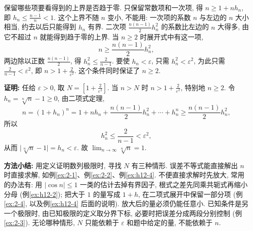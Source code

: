 \documentclass[UTF8,openany]{ctexbook}
\theoremstyle{chinesetextbook}
\newenvironment{cnproof}{\par\indent\textbf{证明:} \ignorespaces}{\par}
\begin{document}
保留哪些项要看得到的上界是否趋于零. 只保留常数项和一次项, 得 $n\ge1+nh_n$, 即 $\displaystyle h_n\le\frac{n-1}n<1$. 这个上界不随 $n$ 变小, 不能用: 一次项的系数 $n$ 与左边的 $n$ 大小相当, 约去以后只能得到 $h_n$ 有界. 二次项 $\displaystyle\frac{n(n-1)}2h_n^2$ 的系数比左边的 $n$ 大得多, 由它不超过 $n$ 就能得到趋于零的上界. 当 $n\ge2$ 时展开式中有这一项,
\[
n\ge\frac{n(n-1)}2h_n^2,
\]
两边除以正数 $\displaystyle\frac{n(n-1)}2$, 得 $\displaystyle h_n^2\le\frac2{n-1}$. 要使 $h_n<\varepsilon$, 只需 $h_n^2<\varepsilon^2$, 为此只需 $\displaystyle\frac2{n-1}<\varepsilon^2$, 即 $\displaystyle n>1+\frac2{\varepsilon^2}$. 这个条件同时保证了 $n\ge2$.
\begin{cnproof}
任给 $\varepsilon>0$, 取 $\displaystyle N=\left[1+\frac2{\varepsilon^2}\right]$. 当 $n>N$ 时 $\displaystyle n>1+\frac2{\varepsilon^2}$, 特别地 $n\ge2$. 令 $h_n=\sqrt[n]n-1\ge0$, 由二项式定理,
\[
n=(1+h_n)^n=1+nh_n+\frac{n(n-1)}2h_n^2+\cdots+h_n^n\ge\frac{n(n-1)}2h_n^2,
\]
所以
\[
h_n^2\le\frac2{n-1}<\varepsilon^2,
\]
从而 $\bigl|\sqrt[n]n-1\bigr|=h_n<\varepsilon$. 故 $\displaystyle\lim_{n\to\infty}\sqrt[n]n=1$.
\end{cnproof}
\par\indent\textbf{方法小结:} 用定义证明数列极限时, 寻找 $N$ 有三种情形. 误差不等式能直接解出 $n$ 时直接求解, 如例\ref{ex:2-1}、例\ref{ex:2-2}、例\ref{ex:h12-4}. 不便直接求解时先放大, 常用的办法有: 用 $|\cos n|\le1$ 一类的估计去掉有界因子, 根式之差先同乘共轭式再缩小分母 (例\ref{ex:h12-2}); 把大于 $1$ 的量写成 $1+h$, 在二项式展开中保留一部分项 (例\ref{ex:2-4}, 以及例\ref{ex:h12-4} 后面的说明). 放大后的量必须仍能任意小. 已知条件是另一个极限时, 由已知极限的定义取分界下标, 必要时把误差分成两段分别控制 (例\ref{ex:2-3}). 无论哪种情形, $N$ 只能依赖于 $\varepsilon$ 和题中给定的量, 不能依赖于 $n$.
\end{document}
